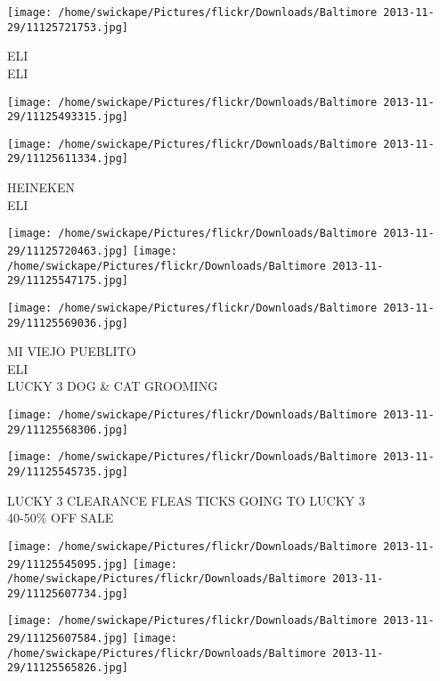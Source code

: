 \documentclass[10pt,letterpaper]{article}
\begin{document}
\vspace{0.25in}
\texttt{[image: /home/swickape/Pictures/flickr/Downloads/Baltimore 2013-11-29/11125721753.jpg]}

ELI\\
ELI\\
\pagebreak

\texttt{[image: /home/swickape/Pictures/flickr/Downloads/Baltimore 2013-11-29/11125493315.jpg]}

\vspace{0.25in}
\texttt{[image: /home/swickape/Pictures/flickr/Downloads/Baltimore 2013-11-29/11125611334.jpg]}

HEINEKEN\\
ELI\\
\pagebreak

\texttt{[image: /home/swickape/Pictures/flickr/Downloads/Baltimore 2013-11-29/11125720463.jpg]}
\texttt{[image: /home/swickape/Pictures/flickr/Downloads/Baltimore 2013-11-29/11125547175.jpg]}

\vspace{0.25in}
\texttt{[image: /home/swickape/Pictures/flickr/Downloads/Baltimore 2013-11-29/11125569036.jpg]}

MI VIEJO PUEBLITO\\
ELI\\
LUCKY 3 DOG \& CAT GROOMING\\
\pagebreak

\texttt{[image: /home/swickape/Pictures/flickr/Downloads/Baltimore 2013-11-29/11125568306.jpg]}

\vspace{0.25in}
\texttt{[image: /home/swickape/Pictures/flickr/Downloads/Baltimore 2013-11-29/11125545735.jpg]}

LUCKY 3 CLEARANCE FLEAS TICKS GOING TO LUCKY 3\\
40{-}50\% OFF SALE\\
\pagebreak

\texttt{[image: /home/swickape/Pictures/flickr/Downloads/Baltimore 2013-11-29/11125545095.jpg]}
\texttt{[image: /home/swickape/Pictures/flickr/Downloads/Baltimore 2013-11-29/11125607734.jpg]}

\texttt{[image: /home/swickape/Pictures/flickr/Downloads/Baltimore 2013-11-29/11125607584.jpg]}
\texttt{[image: /home/swickape/Pictures/flickr/Downloads/Baltimore 2013-11-29/11125565826.jpg]}
\end{document}
